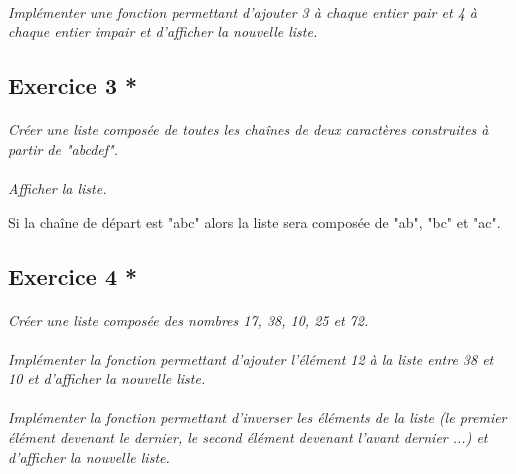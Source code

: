 \documentclass[11pt,oneside]{article}
\begin{document}
\paragraph{}
\textit{Implémenter une fonction permettant d'ajouter 3 à chaque entier pair et 4 à chaque entier impair et d'afficher la nouvelle liste.}


\setcounter{paragraph}{0}
\subsection*{Exercice 3 * }

\paragraph{}
\textit{Créer une liste composée de toutes les chaînes de deux caractères construites à partir de "abcdef".}

\paragraph{}
\textit{Afficher la liste.}

\begin{exemple}
Si la chaîne de départ est "abc" alors la liste sera composée de "ab", "bc" et "ac".
\end{exemple}


\setcounter{paragraph}{0}
\subsection*{Exercice 4 *}

\paragraph{}
\textit{Créer une liste composée des nombres 17, 38, 10, 25 et 72.}

\paragraph{}
\textit{Implémenter la fonction permettant d'ajouter l'élément 12 à la liste entre 38 et 10 et d'afficher la nouvelle liste.}


\paragraph{}
\textit{Implémenter la fonction permettant d'inverser les éléments de la liste (le premier élément devenant le dernier, le second élément devenant l'avant dernier ...) et d'afficher la nouvelle liste.}
\end{document}
